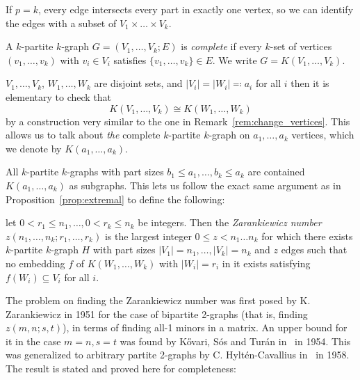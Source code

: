 \begin{remark}
    If $p=k$, every edge intersects every part in exactly one vertex,
    so we can identify the edges with a subset of $ V_1 \times \dots \times V_k$.
\end{remark}

\begin{definition}
    A $k$-partite $k$-graph $G = (V_1, \dots, V_k; E)$ is \emph{complete}
    if every $k$-set of vertices $(v_1, \dots, v_k)$ with $v_i \in V_i$
    satisfies $\{v_1, \dots, v_k\} \in E$.
    We write $G = K(V_1, \dots, V_k)$.
\end{definition}

\begin{remark}
    $V_1, \dots, V_k$, $W_1, \dots, W_k$ are disjoint sets,
    and $|V_i| = |W_i| \eqqcolon a_i$ for all $i$ then it is elementary to check that
    \[K(V_1, \dots, V_k) \cong K(W_1, \dots, W_k)\]
    by a construction very similar to the one in Remark~\ref{rem:change_vertices}.
    This allows us to talk about \emph{the} complete $k$-partite $k$-graph on
    $a_1, \dots, a_k$ vertices, which we denote by $K(a_1, \dots, a_k)$.
\end{remark}


\begin{remark}
    All $k$-partite $k$-graphs with part sizes $b_1 \leq a_1, \dots, b_k \leq a_k$
    are contained $K(a_1, \dots, a_k)$ as subgraphs.
    This lets us follow the exact same argument as in Proposition~\ref{prop:extremal}
    to define the following:
\end{remark}

\begin{definition}\label{def:zarankiewicz}
    let $0 < r_1 \leq n_1, \dots, 0 < r_k \leq n_k$ be integers.
    Then the \emph{Zarankiewicz number} $z(n_1, \dots, n_k; r_1, \dots, r_k)$
    is the largest integer $0 \leq z < n_1  \dots n_k$ for which there exists $k$-partite $k$-graph
    $H$ with part sizes $ |V_1| = n_1, \dots, |V_k| = n_k$ and $z$ edges
    such that no embedding $f$ of $K(W_1, \dots, W_k)$ with $|W_i| = r_i$ in it exists
    satisfying $f(W_i) \subseteq V_i$ for all $i$.
\end{definition}

The problem on finding the Zarankiewicz number was first posed by K. Zarankiewicz in 1951 for the
case of bipartite 2-graphs (that is, finding $z(m, n; s, t)$),
in terms of finding all-1 minors in a matrix.
An upper bound for it in the case $m=n, s=t$ was found by Kővari, Sós and Turán in~\cite{Kovari1954} in 1954.
This was generalized to arbitrary partite 2-graphs by C. Hyltén-Cavallius in~\cite{Hylten1958}
in 1958.
The result is stated and proved here for completeness:

